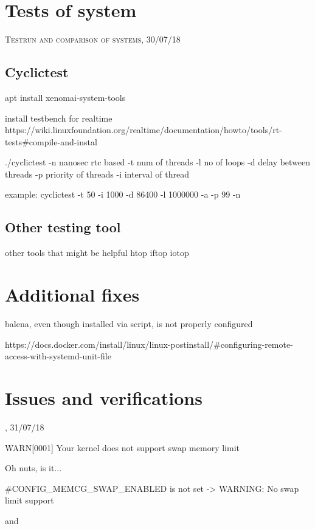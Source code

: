 \documentclass[]{scrartcl}
\begin{document}
\section{Tests of system}

{\small\textsc{Testrun and comparison of systems, 30/07/18} \bigskip}

\subsection{Cyclictest}

apt install xenomai-system-tools

install testbench for realtime
https://wiki.linuxfoundation.org/realtime/documentation/howto/tools/rt-tests#compile-and-instal



./cyclictest 
-n nanosec rtc based
-t num of threads
-l no of loops
-d delay between threads
-p priority of threads
-i interval of thread


example: 
cyclictest -t 50 -i 1000 -d 86400 -l 1000000 -a -p 99 -n

\subsection{Other testing tool}

other tools that might be helpful
htop
iftop
iotop


\section{Additional fixes}

balena, even though installed via script, is not properly configured

https://docs.docker.com/install/linux/linux-postinstall/#configuring-remote-access-with-systemd-unit-file


\section{Issues and verifications}

{\small\textsc{, 31/07/18} \bigskip}



WARN[0001] Your kernel does not support swap memory limit 

Oh nuts, is it...

#CONFIG_MEMCG_SWAP_ENABLED is not set -> WARNING: No swap limit support

and
\end{document}
